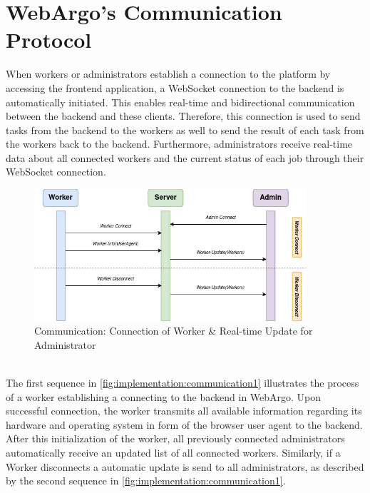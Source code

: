 \section{WebArgo's Communication Protocol}
\label{sec:implementation:communication}
When workers or administrators establish a connection to the platform by accessing the frontend application, a WebSocket connection to the backend is automatically initiated. This enables real-time and bidirectional communication between the backend and these clients. Therefore, this connection is used to send tasks from the backend to the workers as well to send the result of each task from the workers back to the backend. Furthermore, administrators receive real-time data about all connected workers and the current status of each job through their WebSocket connection.
\begin{figure}[htbp]
    \centering
    \includegraphics[width=0.9\textwidth]{gfx/figures/communication-connection-label.png}
    \caption{Communication: Connection of Worker \& Real-time Update for Administrator}
    \label{fig:implementation:communication1}
\end{figure}
~\\
The first sequence in \autoref{fig:implementation:communication1} illustrates the process of a worker establishing a connecting to the backend in WebArgo. Upon successful connection, the worker transmits all available information regarding its hardware and operating system in form of the browser user agent to the backend. After this initialization of the worker, all previously connected administrators automatically receive an updated list of all connected workers. Similarly, if a Worker disconnects a automatic update is send to all administrators, as described by the second sequence in \autoref{fig:implementation:communication1}.
